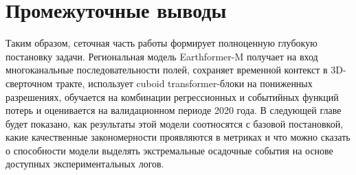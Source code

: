 \section{Промежуточные выводы}

Таким образом, сеточная часть работы формирует полноценную глубокую постановку задачи. Региональная модель Earthformer-M получает на вход многоканальные последовательности полей, сохраняет временной контекст в 3D-сверточном тракте, использует cuboid transformer-блоки на пониженных разрешениях, обучается на комбинации регрессионных и событийных функций потерь и оценивается на валидационном периоде 2020 года. В следующей главе будет показано, как результаты этой модели соотносятся с базовой постановкой, какие качественные закономерности проявляются в метриках и что можно сказать о способности модели выделять экстремальные осадочные события на основе доступных экспериментальных логов.
